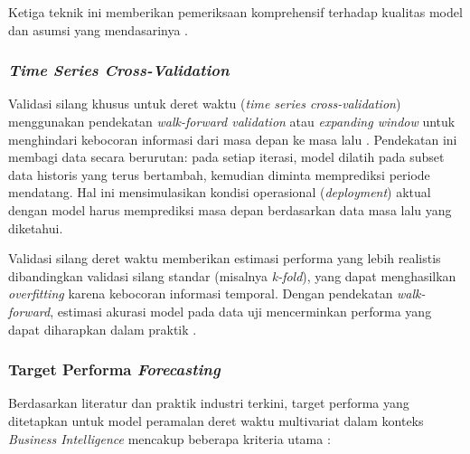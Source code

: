 Ketiga teknik ini memberikan pemeriksaan komprehensif terhadap kualitas model dan asumsi yang mendasarinya \autocite{Petropoulos2023ForecastEval}.

\subsubsection{\textit{Time Series Cross-Validation}}

Validasi silang khusus untuk deret waktu (\textit{time series cross-validation}) menggunakan pendekatan \textit{walk-\-forward va\-li\-da\-tion} atau \textit{expanding window} untuk menghindari kebocoran informasi dari masa depan ke masa lalu \autocite{Spiliotis2020ForecastingBenchmarks}. Pendekatan ini membagi data secara berurutan: pada setiap iterasi, model dilatih pada subset data historis yang terus bertambah, kemudian diminta memprediksi periode mendatang. Hal ini mensimulasikan kondisi operasional (\textit{deployment}) aktual dengan model harus memprediksi masa depan berdasarkan data masa lalu yang diketahui.

Validasi silang deret waktu memberikan estimasi performa yang lebih realistis dibandingkan validasi silang standar (misalnya \textit{k-fold}), yang dapat menghasilkan \textit{overfitting} karena kebocoran informasi temporal. Dengan pendekatan \textit{walk-\-forward}, estimasi akurasi model pada data uji mencerminkan performa yang dapat diharapkan dalam praktik \autocite{Petropoulos2023ForecastEval}.

\subsubsection{Target Performa \textit{Forecasting}}

Berdasarkan literatur dan praktik industri terkini, target performa yang ditetapkan untuk model peramalan deret waktu multivariat dalam konteks \textit{Business Intelligence} mencakup beberapa kriteria utama \autocite{Petropoulos2023ForecastEval,Spiliotis2020ForecastingBenchmarks}:

